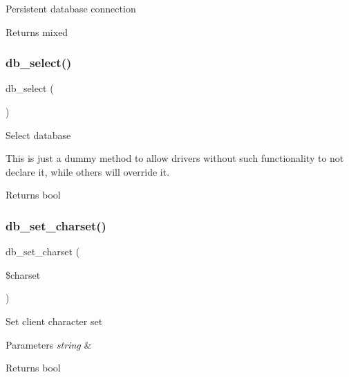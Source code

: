 Persistent database connection

\begin{DoxyReturn}{Returns}
mixed 
\end{DoxyReturn}
\mbox{\label{class_c_i___d_b__driver_af0c7f2602586ea2050b19fb36baefb24}} 
\subsubsection{\texorpdfstring{db\+\_\+select()}{db\_select()}}
{\footnotesize\ttfamily db\+\_\+select (\begin{DoxyParamCaption}{ }\end{DoxyParamCaption})}

Select database

This is just a dummy method to allow drivers without such functionality to not declare it, while others will override it.

\begin{DoxyReturn}{Returns}
bool 
\end{DoxyReturn}
\mbox{\label{class_c_i___d_b__driver_a66d47c23180629f6ccea934fd2ab6d0e}} 
\subsubsection{\texorpdfstring{db\+\_\+set\+\_\+charset()}{db\_set\_charset()}}
{\footnotesize\ttfamily db\+\_\+set\+\_\+charset (\begin{DoxyParamCaption}\item[{}]{\$charset }\end{DoxyParamCaption})}

Set client character set


\begin{DoxyParams}{Parameters}
{\em string} & \\
\hline
\end{DoxyParams}
\begin{DoxyReturn}{Returns}
bool 
\end{DoxyReturn}
\mbox{\label{class_c_i___d_b__driver_a1ca178ae41a8c6c0e461dfb2653cfd81}} 
